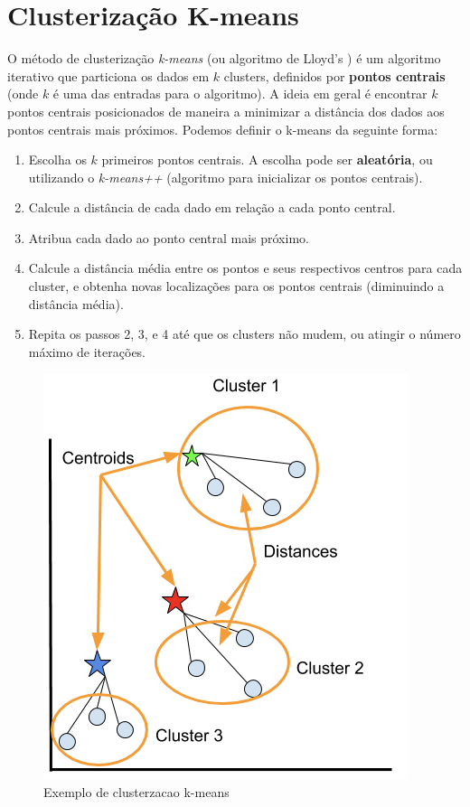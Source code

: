  \section{Clusterização K-means}
O método de clusterização \emph{k-means} (ou algoritmo de Lloyd's \cite{Lloyd}) é um algoritmo iterativo que particiona os dados em $k$ clusters, definidos por \textbf{pontos centrais} (onde $k$ é uma das entradas para o algoritmo).
A ideia em geral é encontrar $k$ pontos centrais posicionados de maneira a minimizar a distância dos dados aos pontos centrais mais próximos. 
Podemos definir o k-means da seguinte forma:
 \begin{enumerate}
 	\item Escolha os $k$ primeiros pontos centrais. A escolha pode ser \textbf{aleatória}, ou utilizando o \emph{k-means++} (algoritmo para inicializar os pontos centrais).
	\item Calcule a distância de cada dado em relação a cada ponto central.
	\item Atribua cada dado ao ponto central mais próximo.
	\item Calcule a distância média entre os pontos e seus respectivos centros para cada cluster, e obtenha novas localizações para os pontos centrais (diminuindo a distância média).
	\item Repita os passos 2, 3, e 4 até que os clusters não mudem, ou atingir o número máximo de iterações.
\end{enumerate}
 
 \begin{figure}[H]
   \centering
   \includegraphics[scale=0.40]{figs/kmeans.png}
    \caption{Exemplo de clusterzacao k-means}
    \label{fig:kmeans}
 \end{figure}
 
